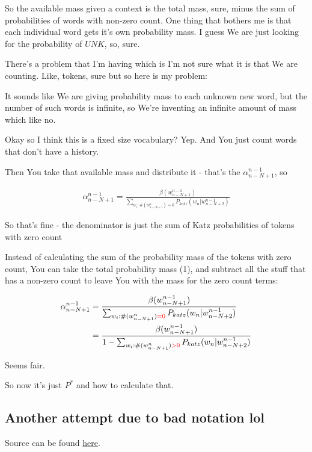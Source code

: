 \documentclass{article}
\begin{document}
	So the available mass given a context is the total mass, sure, minus the sum of probabilities of words with non-zero count. One thing that bothers me is that each individual word gets it's own probability mass. I guess We are just looking for the probability of $UNK$, so, sure.
	
	There's a problem that I'm having which is I'm not sure what it is that We are counting. Like, tokens, sure but so here is my problem:
	
	It sounds like We are giving probability mass to each unknown new word, but the number of such words is infinite, so We're inventing an infinite amount of mass which like no.
	
	Okay so I think this is a fixed size vocabulary? Yep. And You just count words that don't have a history. 
	
	Then You take that available mass and distribute it - that's the $\alpha^{n-1}_{n-N+1}$, so
	
	\begin{align}
		\alpha^{n-1}_{n-N+1} = \frac{\beta(w^{n-1}_{n-N+1})}{\sum_{w_i:\#(w^n_{n-N+1})=0} P_{katz}(w_n|w^{n-1}_{n-N+2})}
	\end{align}
		
	So that's fine - the denominator is just the sum of Katz probabilities of tokens with zero count
		
	Instead of calculating the sum of the probability mass of the tokens with zero count, You can take the total probability mass (1), and subtract all the stuff that has a non-zero count to leave You with the mass for the zero count terms:
		
	\begin{align}
		\alpha^{n-1}_{n-N+1} &= \frac{\beta(w^{n-1}_{n-N+1})}{\sum_{w_i:\#(w^n_{n-N+1})\color{red}{=0}} P_{katz}(w_n|w^{n-1}_{n-N+2})}\\
		&= \frac{\beta(w^{n-1}_{n-N+1})}{1-\sum_{w_i:\#(w^n_{n-N+1})\color{red}{>}0} P_{katz}(w_n|w^{n-1}_{n-N+2})}
	\end{align}	
		
	Seems fair.
	
	So now it's just $P^*$ and how to calculate that. 
	
	\subsection{Another attempt due to bad notation lol}
	
		Source can be found \href{https://dash.harvard.edu/bitstream/handle/1/25104739/tr-10-98.pdf}{here}.
		
\end{document}
